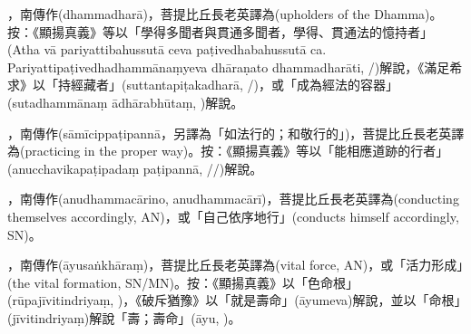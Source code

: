 \startitemgroup[noteitems]
\item{}，南傳作(dhammadharā)，菩提比丘長老英譯為(upholders of the Dhamma)。按：《顯揚真義》等以「學得多聞者與貫通多聞者，學得、貫通法的憶持者」(Atha vā pariyattibahussutā ceva paṭivedhabahussutā ca. Pariyattipaṭivedhadhammānaṃyeva dhāraṇato dhammadharāti, /)解說，《滿足希求》以「持經藏者」(suttantapiṭakadharā, /)，或「成為經法的容器」(sutadhammānaṃ ādhārabhūtaṃ, )解說。
\stopitemgroup

\startitemgroup[noteitems]
\item{}，南傳作(sāmīcippaṭipannā，另譯為「如法行的；和敬行的」)，菩提比丘長老英譯為(practicing in the proper way)。按：《顯揚真義》等以「能相應道跡的行者」(anucchavikapaṭipadaṃ paṭipannā, //)解說。
\stopitemgroup

\startitemgroup[noteitems]
\item{}，南傳作(anudhammacārino, anudhammacārī)，菩提比丘長老英譯為(conducting themselves accordingly, AN)，或「自己依序地行」(conducts himself accordingly, SN)。
\stopitemgroup

\startitemgroup[noteitems]
\item{}，南傳作(āyusaṅkhāraṃ)，菩提比丘長老英譯為(vital force, AN)，或「活力形成」(the vital formation, SN/MN)。按：《顯揚真義》以「色命根」(rūpajīvitindriyaṃ, )，《破斥猶豫》以「就是壽命」(āyumeva)解說，並以「命根」(jīvitindriyaṃ)解說「壽；壽命」(āyu, )。
\stopitemgroup

